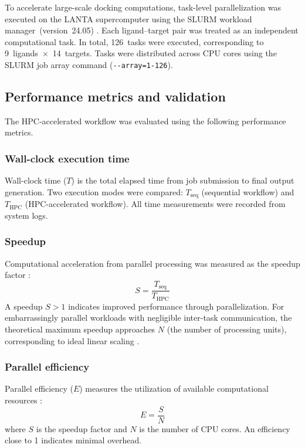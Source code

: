 \documentclass[11pt,a4paper]{article}
\begin{document}
To accelerate large-scale docking computations, task-level parallelization was executed on the LANTA supercomputer using the SLURM workload manager~(version~24.05) \cite{jette2023}. Each ligand--target pair was treated as an independent computational task. In total, 126~tasks were executed, corresponding to 9~ligands~$\times$~14~targets. Tasks were distributed across CPU cores using the SLURM job array command (\texttt{-{}-array=1-126}).


\subsection{Performance metrics and validation}

The HPC-accelerated workflow was evaluated using the following performance metrics.

\subsubsection{Wall-clock execution time}

Wall-clock time ($T$) is the total elapsed time from job submission to final output generation. Two execution modes were compared: $T_{\text{seq}}$ (sequential workflow) and $T_{\text{HPC}}$ (HPC-accelerated workflow). All time measurements were recorded from system logs.

\subsubsection{Speedup}

Computational acceleration from parallel processing was measured as the speedup factor \cite{amdahl1967}:
%
\begin{equation}
S = \frac{T_{\text{seq}}}{T_{\text{HPC}}}
\label{eq:speedup}
\end{equation}
%
A speedup $S > 1$ indicates improved performance through parallelization. For embarrassingly parallel workloads with negligible inter-task communication, the theoretical maximum speedup approaches $N$ (the number of processing units), corresponding to ideal linear scaling \cite{amdahl1967}.

\subsubsection{Parallel efficiency}

Parallel efficiency ($E$) measures the utilization of available computational resources \cite{eijkhout2010}:
%
\begin{equation}
E = \frac{S}{N}
\label{eq:efficiency}
\end{equation}
%
where $S$ is the speedup factor and $N$ is the number of CPU cores. An efficiency close to 1 indicates minimal overhead.
\end{document}
